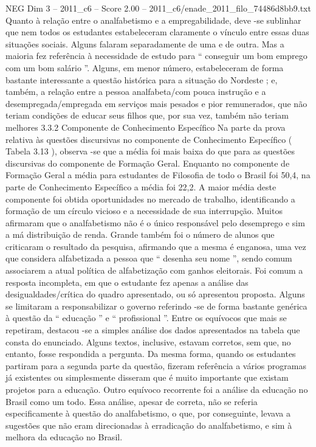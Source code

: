 \begin{textsample}{NEG Dim 3 – 2011\_c6 – Score 2.00 – 2011\_c6/enade\_2011\_filo\_74486d8bb9.txt}
Quanto à relação entre o analfabetismo e a empregabilidade, deve -se sublinhar que nem todos os estudantes estabeleceram claramente o vínculo entre essas duas situações sociais.
Alguns falaram separadamente de uma e de outra.
Mas a maioria fez referência à necessidade de estudo para “ conseguir um bom emprego com um bom salário ”.
Alguns, em menor número, estabeleceram de forma bastante interessante a questão histórica para a situação do Nordeste ; e, também, a relação entre a pessoa analfabeta/com pouca instrução e a desempregada/empregada em serviços mais pesados e pior remunerados, que não teriam condições de educar seus filhos que, por sua vez, também não teriam melhores 3.3.2 Componente de Conhecimento Específico Na parte da prova relativa às questões discursivas no componente de Conhecimento Específico ( Tabela 3.13 ), observa -se que a média foi mais baixa do que para as questões discursivas do componente de Formação Geral.
Enquanto no componente de Formação Geral a média para estudantes de Filosofia de todo o Brasil foi 50,4, na parte de Conhecimento Específico a média foi 22,2.
A maior média deste componente foi obtida oportunidades no mercado de trabalho, identificando a formação de um círculo vicioso e a necessidade de sua interrupção.
Muitos afirmaram que o analfabetismo não é o único responsável pelo desemprego e sim a má distribuição de renda.
Grande também foi o número de alunos que criticaram o resultado da pesquisa, afirmando que a mesma é enganosa, uma vez que considera alfabetizada a pessoa que “ desenha seu nome ”, sendo comum associarem a atual política de alfabetização com ganhos eleitorais.
Foi comum a resposta incompleta, em que o estudante fez apenas a análise das desigualdades/crítica do quadro apresentado, ou só apresentou proposta.
Alguns se limitaram a responsabilizar o governo referindo -se de forma bastante genérica à questão da “ educação ” e “ profissional ”.
Entre os equívocos que mais se repetiram, destacou -se a simples análise dos dados apresentados na tabela que consta do enunciado.
Alguns textos, inclusive, estavam corretos, sem que, no entanto, fosse respondida a pergunta.
Da mesma forma, quando os estudantes partiram para a segunda parte da questão, fizeram referência a vários programas já existentes ou simplesmente disseram que é muito importante que existam projetos para a educação.
Outro equívoco recorrente foi a análise da educação no Brasil como um todo.
Essa análise, apesar de correta, não se referia especificamente à questão do analfabetismo, o que, por conseguinte, levava a sugestões que não eram direcionadas à erradicação do analfabetismo, e sim à melhora da educação no Brasil.

\end{textsample}
